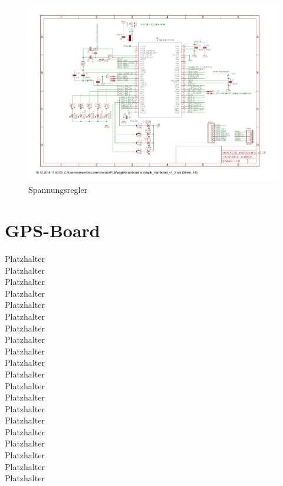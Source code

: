 \documentclass[a4paper]{scrartcl}
\begin{document}
\begin{figure}[H]\centering
\includegraphics[page=8, angle=90, width=\linewidth]{../eagle/Mainboard/watchplb_mainboard_v1_0.pdf}
\caption{Spannungsregler}
\label{fig:abb1}
\end{figure}

\section{GPS-Board}

Platzhalter\\Platzhalter\\Platzhalter\\Platzhalter\\Platzhalter\\
Platzhalter\\Platzhalter\\Platzhalter\\Platzhalter\\Platzhalter\\
Platzhalter\\Platzhalter\\Platzhalter\\Platzhalter\\Platzhalter\\
Platzhalter\\Platzhalter\\Platzhalter\\Platzhalter\\Platzhalter\\
\end{document}
